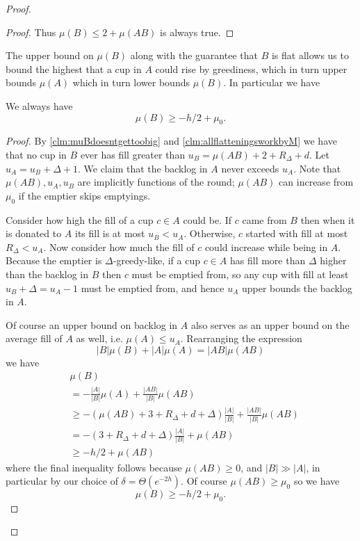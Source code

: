 \begin{proof}
\begin{proof}
  Thus $\mu(B) \le 2 + \mu(A B)$ is always true.

\end{proof}

The upper bound on $\mu(B)$ along with the guarantee that $B$ is
flat allows us to bound the highest that a cup in $A$ could rise
by greediness, which in turn upper bounds $\mu(A)$ which in turn
lower bounds $\mu(B)$. In particular we have
\begin{clm}
  \label{clm:muBgreaterthanminushover2}
  We always have
  $$\mu(B) \ge -h/2 + \mu_0.$$
\end{clm}
\begin{proof}
  By \cref{clm:muBdoesntgettoobig} and \cref{clm:allflatteningsworkbyM} 
  we have that no cup in $B$ ever has fill greater than
  $u_B = \mu(A B) + 2 + R_\Delta + d$. 
  Let $u_A = u_B + \Delta + 1$. We claim that the backlog in $A$
  never exceeds $u_A$. Note that $\mu(AB), u_A, u_B$ are
  implicitly functions of the round; $\mu(AB)$ can increase from
  $\mu_0$ if the emptier skips emptyings.

  Consider how high the fill of a cup $c \in A$ could be.
  If $c$ came from $B$ then when it is donated
  to $A$ its fill is at most $u_B < u_A$. Otherwise, $c$
  started with fill at most $R_\Delta < u_A$. Now consider how
  much the fill of $c$ could increase while being in $A$. Because
  the emptier is $\Delta$-greedy-like, if a cup $c\in A$ has fill
  more than $\Delta$ higher than the backlog in $B$ then $c$ must
  be emptied from, so any cup with fill at least $u_B + \Delta =
  u_A - 1$ must be emptied from, and hence $u_A$ upper bounds the
  backlog in $A$. 

  Of course an upper bound on backlog in $A$ also serves as
  an upper bound on the average fill of $A$ as well, i.e.
  $\mu(A) \le u_A$. 
  Rearranging the expression 
  $$|B|\mu(B) + |A|\mu(A) = |AB|\mu(AB)$$
  we have
  \begin{align*}
    &\mu(B) \\
           &= -\frac{|A|}{|B|} \mu(A) + \frac{|A B|}{|B|}\mu(A B) \\
           &\ge -(\mu(AB) + 3+R_\Delta+d+\Delta) \frac{|A|}{|B|} + \frac{|AB|}{|B|}\mu(AB)\\
           &= -(3+R_\Delta+d + \Delta) \frac{|A|}{|B|} + \mu(AB)\\
           &\ge -h/2 + \mu(AB)
  \end{align*}
  where the final inequality follows because $\mu(AB) \ge 0$, and
  $|B|\gg |A|$, in particular by our choice of $\delta = \Theta(e^{-2h})$.
  Of course $\mu(AB) \ge \mu_0$ so we have
  $$\mu(B) \ge -h/2 + \mu_0.$$


\end{proof}
\end{proof}
